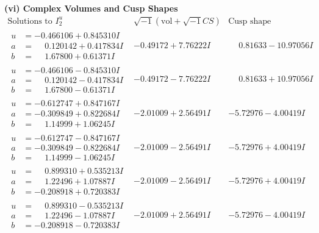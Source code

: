 \documentclass[1p]{elsarticle_modified}
\theoremstyle{definition}
\newcommand{\I}{\sqrt{-1}}
\begin{document}
\newpage\flushleft \textbf{(vi) Complex Volumes and Cusp Shapes}
$$\begin{array}{c|c|c}  
\text{Solutions to }I^u_{2}& \I (\text{vol} + \sqrt{-1}CS) & \text{Cusp shape}\\
 \hline 
\begin{aligned}
u &= -0.466106 + 0.845310 I \\
a &= \phantom{-}0.120142 + 0.417834 I \\
b &= \phantom{-}1.67800 + 0.61371 I\end{aligned}
 & -0.49172 + 7.76222 I & \phantom{-}0.81633 - 10.97056 I \\ \hline\begin{aligned}
u &= -0.466106 - 0.845310 I \\
a &= \phantom{-}0.120142 - 0.417834 I \\
b &= \phantom{-}1.67800 - 0.61371 I\end{aligned}
 & -0.49172 - 7.76222 I & \phantom{-}0.81633 + 10.97056 I \\ \hline\begin{aligned}
u &= -0.612747 + 0.847167 I \\
a &= -0.309849 + 0.822684 I \\
b &= \phantom{-}1.14999 + 1.06245 I\end{aligned}
 & -2.01009 + 2.56491 I & -5.72976 - 4.00419 I \\ \hline\begin{aligned}
u &= -0.612747 - 0.847167 I \\
a &= -0.309849 - 0.822684 I \\
b &= \phantom{-}1.14999 - 1.06245 I\end{aligned}
 & -2.01009 - 2.56491 I & -5.72976 + 4.00419 I \\ \hline\begin{aligned}
u &= \phantom{-}0.899310 + 0.535213 I \\
a &= \phantom{-}1.22496 + 1.07887 I \\
b &= -0.208918 + 0.720383 I\end{aligned}
 & -2.01009 - 2.56491 I & -5.72976 + 4.00419 I \\ \hline\begin{aligned}
u &= \phantom{-}0.899310 - 0.535213 I \\
a &= \phantom{-}1.22496 - 1.07887 I \\
b &= -0.208918 - 0.720383 I\end{aligned}
 & -2.01009 + 2.56491 I & -5.72976 - 4.00419 I \\ \hline\begin{aligned}

\end{aligned}
\end{array}$$
\end{document}
